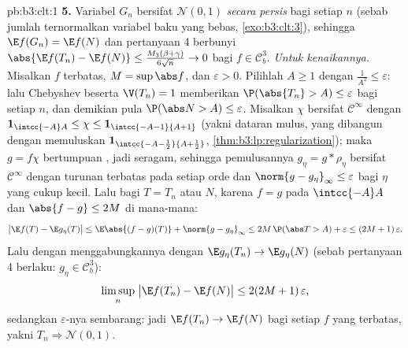 \begin{solution}{pb:b3:clt:1}
\textbf{5.} Variabel $G_n$ bersifat $\mathcal N(0,1)$ \emph{secara persis} bagi
setiap $n$ (sebab jumlah ternormalkan variabel  baku yang
bebas, \cref{exo:b3:clt:3}), sehingga $\E f(G_n) = \E f(N)$
dan pertanyaan 4 berbunyi $\abs{\E f(T_n) - \E f(N)} \leq
\frac{M_3(\beta+\gamma)}{6\sqrt n} \to 0$ bagi $f \in
\mathcal C^3_b$. \emph{Untuk kenaikannya.} Misalkan $f$ 
terbatas, $M = \sup\abs f$, dan $\varepsilon > 0$. Pilihlah $A
\geq 1$ dengan $\frac1{A^2} \leq \varepsilon$: lalu Chebyshev beserta
$\V(T_n) = 1$ memberikan $\P(\abs{T_n} > A) \leq \varepsilon$
bagi setiap $n$, dan demikian pula $\P(\abs N > A) \leq \varepsilon$.
Misalkan $\chi$ bersifat $\mathcal C^\infty$ dengan
$\mathbf 1_{\intcc{-A}A} \leq \chi \leq
\mathbf 1_{\intcc{-A-1}{A+1}}$ (yakni dataran mulus, yang dibangun dengan
memuluskan $\mathbf 1_{\intcc{-A-\frac12}{A+\frac12}}$,
\cref{thm:b3:lp:regularization}); maka $g = f\chi$ 
bertumpuan , jadi  seragam, sehingga
pemulusannya $g_\eta = g * \rho_\eta$ bersifat $\mathcal
C^\infty$ dengan turunan terbatas pada setiap orde dan
$\norm{g - g_\eta}_\infty \leq \varepsilon$ bagi $\eta$ yang
cukup kecil. Lalu bagi $T = T_n$ atau $N$, karena $f = g$ pada
$\intcc{-A}A$ dan $\abs{f - g} \leq 2M$ di mana-mana:
\[
\bigl|\E f(T) - \E g_\eta(T)\bigr| \leq
\E\abs{(f - g)(T)} + \norm{g - g_\eta}_\infty
\leq 2M\,\P(\abs T > A) + \varepsilon \leq
(2M + 1)\,\varepsilon .
\]
Lalu dengan menggabungkannya dengan $\E g_\eta(T_n) \to \E g_\eta(N)$ (sebab pertanyaan
4 berlaku: $g_\eta \in \mathcal C^3_b$):
\[
\limsup_n\;\bigl|\E f(T_n) - \E f(N)\bigr| \leq
2(2M + 1)\,\varepsilon ,
\]
sedangkan $\varepsilon$-nya sembarang: jadi $\E f(T_n) \to \E f(N)$ bagi
setiap $f$ yang  terbatas, yakni $T_n \Rightarrow
\mathcal N(0,1)$.


\end{solution}
